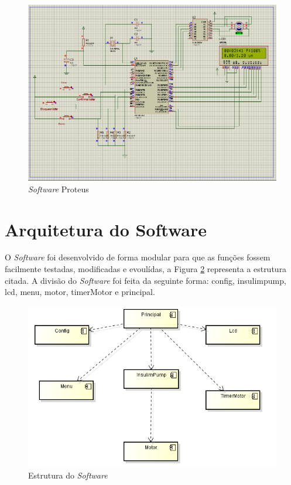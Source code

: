 \begin{figure}[htp]
	\centering
	\includegraphics[scale=0.5]{images/proteus.png}
	\caption{\emph{Software} Proteus}	
	\label{fig:proteus}
\end{figure}

\section{Arquitetura do Software}

O \emph{Software} foi desenvolvido de forma modular para que as funções fossem facilmente testadas, modificadas e evoulídas, a Figura \ref{fig:arquiteturageral} representa a estrutura citada. A divisão do \emph{Software} foi feita da seguinte forma: config, insulimpump, lcd, menu, motor, timerMotor e principal. 

\begin{figure}[htp]
	\centering
	\includegraphics[scale=0.7]{images/arquitetura.png}
	\caption{Estrutura do \emph{Software}}	
	\label{fig:arquiteturageral}
\end{figure}

